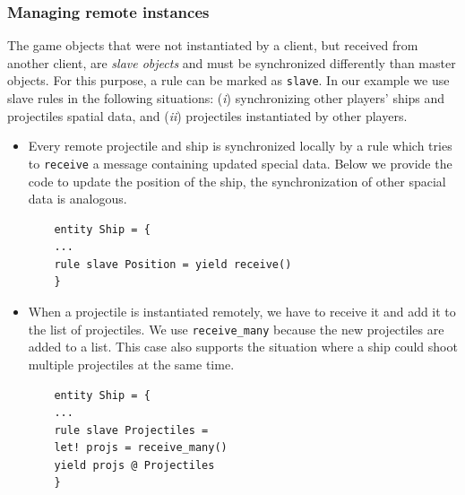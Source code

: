\subsubsection*{Managing remote instances}
The game objects that were not instantiated by a client, but received from another client, are \textit{slave objects} and must be synchronized differently than master objects. For this purpose, a rule can be marked as \texttt{slave}. In our example we use slave rules in the following situations: (\textit{i}) synchronizing other players' ships and projectiles spatial data, and (\textit{ii}) projectiles instantiated by other players.

\begin{itemize}[(i)]
	\item Every remote projectile and ship is synchronized locally by a rule which tries to \texttt{receive} a message containing updated special data. Below we provide the code to update the position of the ship, the synchronization of other spacial data is analogous.
	
	\begin{lstlisting}
	entity Ship = {
	...
	rule slave Position = yield receive()
	}
	\end{lstlisting}
	
	\item When a projectile is instantiated remotely, we have to receive it and add it to the list of projectiles. We use \texttt{receive\_many} because the new projectiles are added to a list. This case also supports the situation where a ship could shoot multiple projectiles at the same time.
	
	\begin{lstlisting}
	entity Ship = {
	...
	rule slave Projectiles =
	let! projs = receive_many()
	yield projs @ Projectiles
	}
	\end{lstlisting} 
\end{itemize}